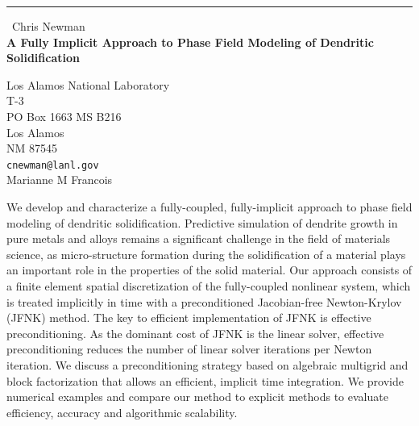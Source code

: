 \documentclass{report}
\begin{document}
\begin{center}
\rule{6in}{1pt} \
{\large Chris Newman \\
{\bf A Fully Implicit Approach to Phase Field Modeling of Dendritic Solidification}}

Los Alamos National Laboratory \\ T-3 \\ PO Box 1663 MS B216 \\ Los Alamos \\ NM 87545
\\
{\tt cnewman@lanl.gov}\\
Marianne M Francois\end{center}

We develop and characterize a fully-coupled, fully-implicit approach to phase field
modeling of dendritic solidification.
Predictive simulation of dendrite growth in pure metals and alloys
remains a significant challenge in the field of materials science,
as micro-structure formation during the solidification of a material plays an
important role in the properties of the solid material.
Our approach consists of a finite element spatial discretization of the
fully-coupled nonlinear system, which
is treated implicitly in time with a preconditioned Jacobian-free
Newton-Krylov (JFNK) method.
The key to efficient implementation of JFNK is effective preconditioning.
As the dominant cost of JFNK is the linear solver, effective preconditioning
reduces the number of linear solver iterations per Newton iteration.
We discuss a preconditioning strategy based on algebraic multigrid and
block factorization
that allows an efficient, implicit time integration.
We provide numerical examples and
compare our method to explicit methods to evaluate efficiency, accuracy
and algorithmic scalability.
\end{document}
